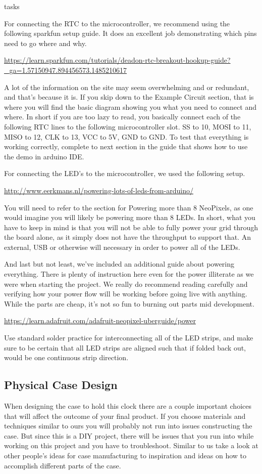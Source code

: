 tasks\documentclass[onecolumn, draftclsnofoot,10pt, compsoc]{IEEEtran}
\begin{document}
For connecting the RTC to the microcontroller, we recommend using the following sparkfun setup guide.
It does an excellent job demonstrating which pins need to go where and why.

\url{https://learn.sparkfun.com/tutorials/deadon-rtc-breakout-hookup-guide?_ga=1.57150947.894456573.1485210617}

A lot of the information on the site may seem overwhelming and or redundant, and that's because it is.
If you skip down to the Example Circuit section, that is where you will find the basic diagram showing you what you need to connect and where.
In short if you are too lazy to read, you basically connect each of the following RTC lines to the following microcontroller slot.
SS to 10, MOSI to 11, MISO to 12, CLK to 13, VCC to 5V, GND to GND.
To test that everything is working correctly, complete to next section in the guide that shows how to use the demo in arduino IDE.

For connecting the LED's to the microcontroller, we used the following setup.

\url{http://www.eerkmans.nl/powering-lots-of-leds-from-arduino/}

You will need to refer to the section for Powering more than 8 NeoPixels, as one would imagine you will likely be powering more than 8 LEDs.
In short, what you have to keep in mind is that you will not be able to fully power your grid through the board alone, as it simply does not have the throughput to support that.
An external, USB or otherwise will necessary in order to power all of the LEDs.

And last but not least, we've included an additional guide about powering everything.
There is plenty of instruction here even for the power illiterate as we were when starting the project.
We really do recommend reading carefully and verifying how your power flow will be working before going live with anything.
While the parts are cheap, it's not so fun to burning out parts mid development.

\url{https://learn.adafruit.com/adafruit-neopixel-uberguide/power}

Use standard solder practice for interconnecting all of the LED strips, and make sure to be certain that all LED strips are aligned such that if folded back out, would be one continuous strip direction.


\subsection{Physical Case Design}
When designing the case to hold this clock there are a couple important choices that will affect the outcome of your final product.
If you choose materials and techniques similar to ours you will probably not run into issues constructing the case.
But since this is a DIY project, there will be issues that you run into while working on this project and you have to troubleshoot.
Similar to us take a look at other people's ideas for case manufacturing to inspiration and ideas on how to accomplish different parts of the case.
\end{document}

